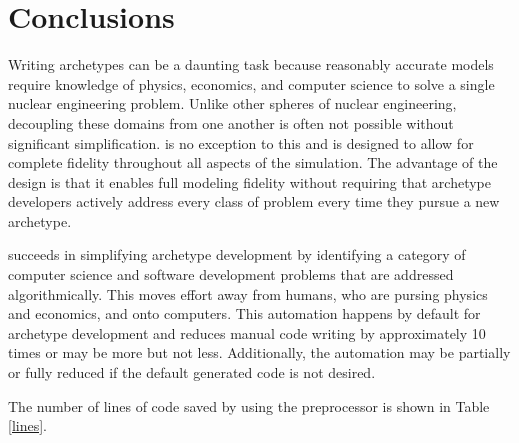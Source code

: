 \section{Conclusions}
\label{sec-conc}

Writing archetypes can be a daunting task because reasonably accurate models 
require knowledge of physics, economics, and computer science to solve a single nuclear engineering 
problem.  Unlike other spheres of nuclear engineering, decoupling these domains from
one another is often not possible without significant simplification. \cyclus is 
no exception to this and is designed to allow for complete fidelity throughout 
all aspects of the simulation. The advantage of the \cyclus design is that it 
enables full modeling fidelity without requiring that archetype developers actively 
address every class of problem every time they pursue a new archetype.

\Cyclus succeeds in simplifying archetype development by identifying a category 
of computer science and software development problems that are addressed 
algorithmically. This moves effort away from humans, who are pursing physics and
economics, and onto computers. This automation happens by default for
archetype development and reduces manual code writing by approximately
10 times or may be more but not less.
Additionally, the automation may be partially or fully reduced 
if the default generated code is not desired. 

The number of lines of code saved by using the preprocessor is shown in Table
\ref{lines}.

